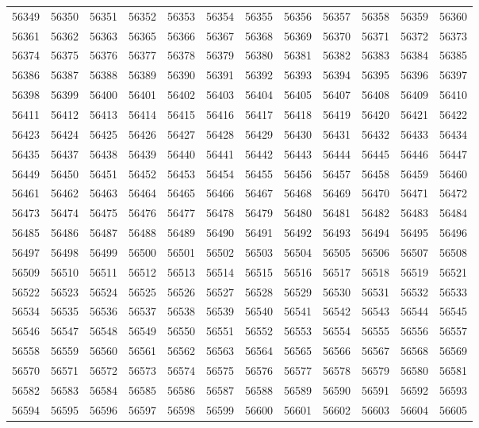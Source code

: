 \begin{center}
\begin{longtable}{llllllllllll}
56349 &56350 &56351 &56352 &56353 &56354 &56355 &56356 &56357 &56358 &56359 &56360 \\
56361 &56362 &56363 &56365 &56366 &56367 &56368 &56369 &56370 &56371 &56372 &56373 \\
56374 &56375 &56376 &56377 &56378 &56379 &56380 &56381 &56382 &56383 &56384 &56385 \\
56386 &56387 &56388 &56389 &56390 &56391 &56392 &56393 &56394 &56395 &56396 &56397 \\
56398 &56399 &56400 &56401 &56402 &56403 &56404 &56405 &56407 &56408 &56409 &56410 \\
56411 &56412 &56413 &56414 &56415 &56416 &56417 &56418 &56419 &56420 &56421 &56422 \\
56423 &56424 &56425 &56426 &56427 &56428 &56429 &56430 &56431 &56432 &56433 &56434 \\
56435 &56437 &56438 &56439 &56440 &56441 &56442 &56443 &56444 &56445 &56446 &56447 \\
56449 &56450 &56451 &56452 &56453 &56454 &56455 &56456 &56457 &56458 &56459 &56460 \\
56461 &56462 &56463 &56464 &56465 &56466 &56467 &56468 &56469 &56470 &56471 &56472 \\
56473 &56474 &56475 &56476 &56477 &56478 &56479 &56480 &56481 &56482 &56483 &56484 \\
56485 &56486 &56487 &56488 &56489 &56490 &56491 &56492 &56493 &56494 &56495 &56496 \\
56497 &56498 &56499 &56500 &56501 &56502 &56503 &56504 &56505 &56506 &56507 &56508 \\
56509 &56510 &56511 &56512 &56513 &56514 &56515 &56516 &56517 &56518 &56519 &56521 \\
56522 &56523 &56524 &56525 &56526 &56527 &56528 &56529 &56530 &56531 &56532 &56533 \\
56534 &56535 &56536 &56537 &56538 &56539 &56540 &56541 &56542 &56543 &56544 &56545 \\
56546 &56547 &56548 &56549 &56550 &56551 &56552 &56553 &56554 &56555 &56556 &56557 \\
56558 &56559 &56560 &56561 &56562 &56563 &56564 &56565 &56566 &56567 &56568 &56569 \\
56570 &56571 &56572 &56573 &56574 &56575 &56576 &56577 &56578 &56579 &56580 &56581 \\
56582 &56583 &56584 &56585 &56586 &56587 &56588 &56589 &56590 &56591 &56592 &56593 \\
56594 &56595 &56596 &56597 &56598 &56599 &56600 &56601 &56602 &56603 &56604 &56605 \\

\end{longtable}
\end{center}

